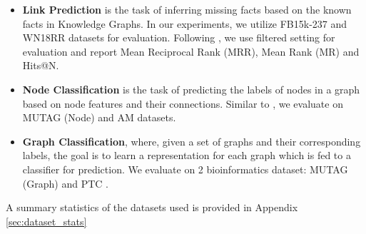 \documentclass{article} \usepackage{iclr2020_conference,times}
\begin{document}
\begin{itemize}[itemsep=2pt,parsep=0pt,partopsep=0pt,leftmargin=*,topsep=2pt]

\item  \textbf{Link Prediction} is the task of inferring missing facts based on the known facts in Knowledge Graphs. In our experiments, we utilize FB15k-237 \citep{toutanova} and WN18RR \citep{conve} datasets for evaluation. Following \cite{transe}, we use filtered setting for evaluation and report Mean Reciprocal Rank (MRR), Mean Rank (MR) and Hits@N.
	
\item  \textbf{Node Classification} is the task of predicting the labels of nodes in a graph based on node features and their connections. Similar to \cite{r_gcn}, we evaluate \method{} on MUTAG (Node) and AM \citep{rdf2vec} datasets.  

\item \textbf{Graph Classification}, where, given a set of graphs and their corresponding labels, the goal is to learn a representation for each graph which is fed to a classifier for prediction. We evaluate on 2 bioinformatics dataset: MUTAG (Graph) and PTC \citep{graph_datasets}.  


\end{itemize} 
A summary statistics of the datasets used is provided in Appendix \ref{sec:dataset_stats}
\end{document}
